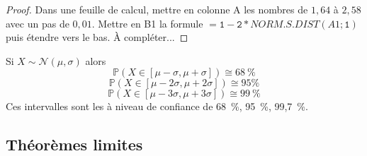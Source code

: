 \begin{proof}
Dans une feuille de calcul, mettre en colonne A les nombres de \(1,64\) à
\(2,58\) avec un pas de \(0,01\). Mettre en B1 la formule
\(=\mathtt{1-2\ast \mathit{NORM.S.DIST}(\mathit{A1};1)}\) puis étendre vers le bas. À compléter...
\end{proof}
\begin{definition}
Si \(𝑋∼𝒩(𝜇,𝜎)\) alors
\begin{equation*}
ℙ(𝑋∈\left[𝜇-𝜎,𝜇+𝜎\right])≅68~\text{\%}
\end{equation*}
\begin{equation*}
ℙ(𝑋∈[𝜇-2𝜎,𝜇+2𝜎])≅95\text{\%}
\end{equation*}
\begin{equation*}
ℙ(𝑋∈[𝜇-3𝜎,𝜇+3𝜎])≅99~\text{\%}
\end{equation*}
Ces intervalles sont les  à niveau de confiance de 68~\%,
95~\%, 99,7~\%.
\end{definition}
\subsection[Théorèmes limites]{Théorèmes limites}
